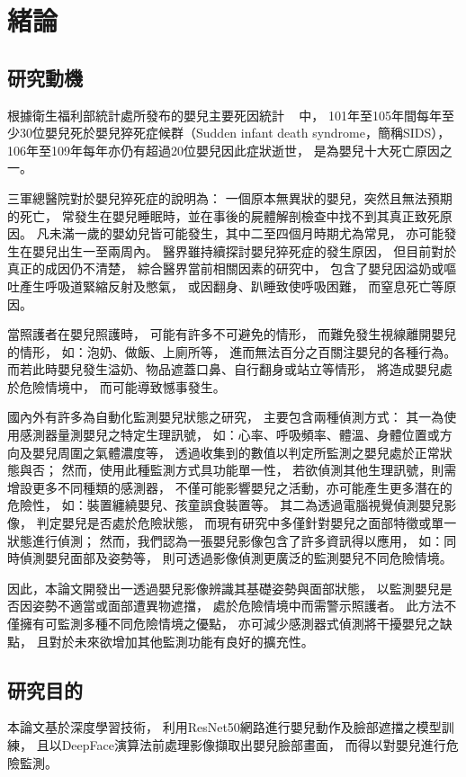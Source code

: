 \documentclass[class=NCU_thesis, crop=false]{standalone}
\begin{document}
\chapter{緒論}
\section{研究動機}
根據衛生福利部統計處所發布的嬰兒主要死因統計
~\cite{__2021}
中，
101年至105年間每年至少30位嬰兒死於嬰兒猝死症候群（Sudden infant death syndrome，簡稱SIDS），
106年至109年每年亦仍有超過20位嬰兒因此症狀逝世，
是為嬰兒十大死亡原因之一。

三軍總醫院對於嬰兒猝死症的說明為：
一個原本無異狀的嬰兒，突然且無法預期的死亡，
常發生在嬰兒睡眠時，並在事後的屍體解剖檢查中找不到其真正致死原因。
凡未滿一歲的嬰幼兒皆可能發生，其中二至四個月時期尤為常見，
亦可能發生在嬰兒出生一至兩周內。
醫界雖持續探討嬰兒猝死症的發生原因，
但目前對於真正的成因仍不清楚，
綜合醫界當前相關因素的研究中，
包含了嬰兒因溢奶或嘔吐產生呼吸道緊縮反射及憋氣，
或因翻身、趴睡致使呼吸困難，
而窒息死亡等原因。

當照護者在嬰兒照護時，
可能有許多不可避免的情形，
而難免發生視線離開嬰兒的情形，
如：泡奶、做飯、上廁所等，
進而無法百分之百關注嬰兒的各種行為。
而若此時嬰兒發生溢奶、物品遮蓋口鼻、自行翻身或站立等情形，
將造成嬰兒處於危險情境中，
而可能導致憾事發生。

國內外有許多為自動化監測嬰兒狀態之研究，
主要包含兩種偵測方式：
其一為使用感測器量測嬰兒之特定生理訊號，
如：心率、呼吸頻率、體溫、身體位置或方向及嬰兒周圍之氣體濃度等，
透過收集到的數值以判定所監測之嬰兒處於正常狀態與否；
然而，使用此種監測方式具功能單一性，
若欲偵測其他生理訊號，則需增設更多不同種類的感測器，
不僅可能影響嬰兒之活動，亦可能產生更多潛在的危險性，
如：裝置纏繞嬰兒、孩童誤食裝置等。
其二為透過電腦視覺偵測嬰兒影像，
判定嬰兒是否處於危險狀態，
而現有研究中多僅針對嬰兒之面部特徵或單一狀態進行偵測；
然而，我們認為一張嬰兒影像包含了許多資訊得以應用，
如：同時偵測嬰兒面部及姿勢等，
則可透過影像偵測更廣泛的監測嬰兒不同危險情境。

因此，本論文開發出一透過嬰兒影像辨識其基礎姿勢與面部狀態，
以監測嬰兒是否因姿勢不適當或面部遭異物遮擋，
處於危險情境中而需警示照護者。
此方法不僅擁有可監測多種不同危險情境之優點，
亦可減少感測器式偵測將干擾嬰兒之缺點，
且對於未來欲增加其他監測功能有良好的擴充性。

\section{研究目的}
本論文基於深度學習技術，
利用ResNet50網路進行嬰兒動作及臉部遮擋之模型訓練，
且以DeepFace演算法前處理影像擷取出嬰兒臉部畫面，
而得以對嬰兒進行危險監測。
\end{document}
